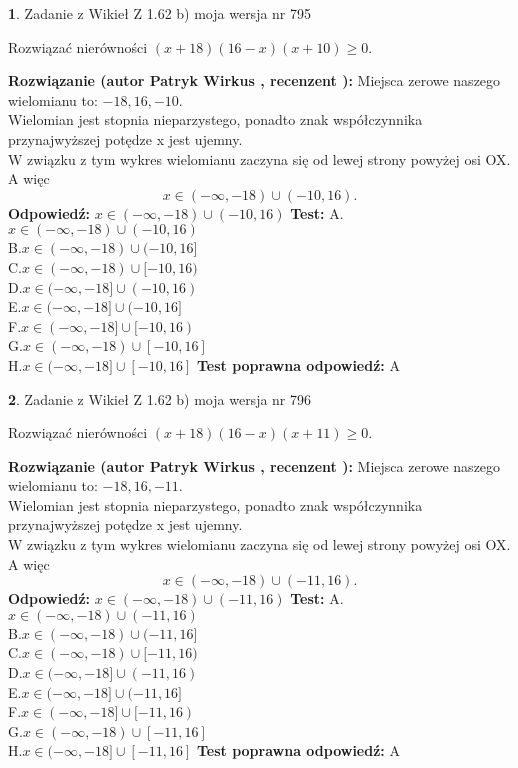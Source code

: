 \documentclass[12pt, a4paper]{article}
\theoremstyle{definition} %
\newtheorem{zad}{}
\newcommand{\zadStart}[1]{\begin{zad}#1\newline}
\newcommand{\zadStop}{\end{zad}}
\newcommand{\rozwStart}[2]{\noindent \textbf{Rozwiązanie (autor #1 , recenzent #2): }\newline}
\newcommand{\rozwStop}{\newline}
\newcommand{\odpStart}{\noindent \textbf{Odpowiedź:}\newline}
\newcommand{\odpStop}{\newline}
\newcommand{\testStart}{\noindent \textbf{Test:}\newline}
\newcommand{\testStop}{\newline}
\newcommand{\kluczStart}{\noindent \textbf{Test poprawna odpowiedź:}\newline}
\newcommand{\kluczStop}{\newline}
\begin{document}
\zadStart{Zadanie z Wikieł Z 1.62 b) moja wersja nr 795}

Rozwiązać nierówności $(x+18)(16-x)(x+10)\ge0$.
\zadStop
\rozwStart{Patryk Wirkus}{}
Miejsca zerowe naszego wielomianu to: $-18, 16, -10$.\\
Wielomian jest stopnia nieparzystego, ponadto znak współczynnika przy\linebreak najwyższej potędze x jest ujemny.\\ W związku z tym wykres wielomianu zaczyna się od lewej strony powyżej osi OX. A więc $$x \in (-\infty,-18) \cup (-10,16).$$
\rozwStop
\odpStart
$x \in (-\infty,-18) \cup (-10,16)$
\odpStop
\testStart
A.$x \in (-\infty,-18) \cup (-10,16)$\\
B.$x \in (-\infty,-18) \cup (-10,16]$\\
C.$x \in (-\infty,-18) \cup [-10,16)$\\
D.$x \in (-\infty,-18] \cup (-10,16)$\\
E.$x \in (-\infty,-18] \cup (-10,16]$\\
F.$x \in (-\infty,-18] \cup [-10,16)$\\
G.$x \in (-\infty,-18) \cup [-10,16]$\\
H.$x \in (-\infty,-18] \cup [-10,16]$
\testStop
\kluczStart
A
\kluczStop



\zadStart{Zadanie z Wikieł Z 1.62 b) moja wersja nr 796}

Rozwiązać nierówności $(x+18)(16-x)(x+11)\ge0$.
\zadStop
\rozwStart{Patryk Wirkus}{}
Miejsca zerowe naszego wielomianu to: $-18, 16, -11$.\\
Wielomian jest stopnia nieparzystego, ponadto znak współczynnika przy\linebreak najwyższej potędze x jest ujemny.\\ W związku z tym wykres wielomianu zaczyna się od lewej strony powyżej osi OX. A więc $$x \in (-\infty,-18) \cup (-11,16).$$
\rozwStop
\odpStart
$x \in (-\infty,-18) \cup (-11,16)$
\odpStop
\testStart
A.$x \in (-\infty,-18) \cup (-11,16)$\\
B.$x \in (-\infty,-18) \cup (-11,16]$\\
C.$x \in (-\infty,-18) \cup [-11,16)$\\
D.$x \in (-\infty,-18] \cup (-11,16)$\\
E.$x \in (-\infty,-18] \cup (-11,16]$\\
F.$x \in (-\infty,-18] \cup [-11,16)$\\
G.$x \in (-\infty,-18) \cup [-11,16]$\\
H.$x \in (-\infty,-18] \cup [-11,16]$
\testStop
\kluczStart
A
\kluczStop
\end{document}
